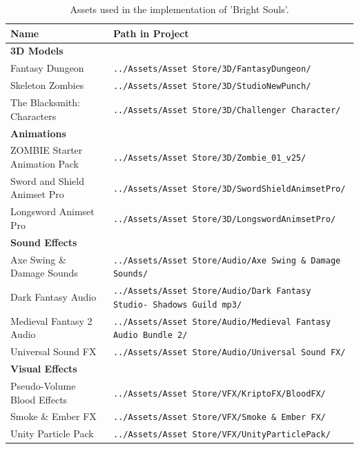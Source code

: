 \documentclass[cic,tc,english]{iiufrgs}
\begin{document}
\begin{table}[h!]
  \begin{center}
    \caption{Assets used in the implementation of 'Bright Souls'.}
    \label{tab:table1}
    \begin{tabular}{ m{10em} m{20em} } %
    
      \textbf{Name}                 & \textbf{Path in Project}                                 \\

      \hline \multicolumn{2}{l|}{\textbf{3D Models}}                                           \\ \hline
      Fantasy Dungeon               & \texttt{../Assets/Asset Store/3D/FantasyDungeon/}        \\ \hline
      Skeleton Zombies              & \texttt{../Assets/Asset Store/3D/StudioNewPunch/}        \\ \hline
      The Blacksmith: Characters    & \texttt{../Assets/Asset Store/3D/Challenger Character/}  \\

      \hline \multicolumn{2}{l|}{\textbf{Animations}}                                          \\ \hline
      ZOMBIE Starter Animation Pack & \texttt{../Assets/Asset Store/3D/Zombie\_01\_v25/}       \\ \hline
      Sword and Shield Animset Pro  & \texttt{../Assets/Asset Store/3D/SwordShieldAnimsetPro/} \\ \hline
      Longsword Animset Pro         & \texttt{../Assets/Asset Store/3D/LongswordAnimsetPro/}   \\

      \hline \multicolumn{2}{l|}{\textbf{Sound Effects}} \\ \hline
      Axe Swing \& Damage Sounds    & \texttt{../Assets/Asset Store/Audio/Axe Swing \& Damage Sounds/}             \\ \hline
      Dark Fantasy Audio            & \texttt{../Assets/Asset Store/Audio/Dark Fantasy Studio- Shadows Guild mp3/} \\ \hline
      Medieval Fantasy 2 Audio      & \texttt{../Assets/Asset Store/Audio/Medieval Fantasy Audio Bundle 2/}        \\ \hline
      Universal Sound FX            & \texttt{../Assets/Asset Store/Audio/Universal Sound FX/}                     \\ 

      \hline \multicolumn{2}{l|}{\textbf{Visual Effects}}                                   \\ \hline
      Pseudo-Volume Blood Effects   & \texttt{../Assets/Asset Store/VFX/KriptoFX/BloodFX/}  \\ \hline
      Smoke \& Ember FX             & \texttt{../Assets/Asset Store/VFX/Smoke \& Ember FX/} \\ \hline
      Unity Particle Pack           & \texttt{../Assets/Asset Store/VFX/UnityParticlePack/} \\


\end{tabular}
\end{center}
\end{table}
\end{document}

